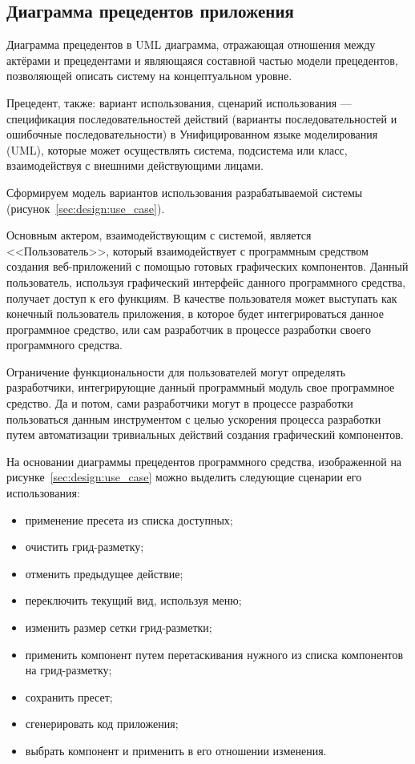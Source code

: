 \subsection{Диаграмма прецедентов приложения}
\label{sec:design:algorithm}

Диаграмма прецедентов в UML диаграмма, отражающая отношения между актёрами и прецедентами и являющаяся составной частью модели прецедентов, позволяющей описать систему на концептуальном уровне.

Прецедент, также: вариант использования, сценарий использования — спецификация последовательностей действий (варианты последовательностей и ошибочные последовательности) в Унифицированном языке моделирования (UML), которые может осуществлять система, подсистема или класс, взаимодействуя с внешними действующими лицами.

Сформируем модель вариантов использования разрабатываемой системы (рисунок~\ref{sec:design:use_case}).

Основным актером, взаимодействующим с системой, является <<Пользователь>>, который взаимодействует с программным средством создания веб-приложений с помощью 
готовых графических компонентов. Данный пользователь, используя графический интерфейс данного программного средства, получает доступ к его функциям. В качестве пользователя может выступать как конечный пользователь приложения, в которое будет интегрироваться данное программное средство, или сам разработчик в процессе разработки своего программного средства.

Ограничение функциональности для пользователей могут определять разработчики, интегрирующие данный программный модуль свое программное средство. Да и потом, сами разработчики могут в процессе разработки пользоваться данным инструментом с целью ускорения процесса разработки путем автоматизации тривиальных действий создания графический компонентов.\pagebreak

На основании диаграммы прецедентов программного средства, изображенной на рисунке~\ref{sec:design:use_case} можно выделить следующие сценарии его использования:
\begin{itemize}
    \item применение пресета из списка доступных;
    \item очистить грид-разметку;
    \item отменить предыдущее действие;
    \item переключить текущий вид, используя меню;
    \item изменить размер сетки грид-разметки;
    \item применить компонент путем перетаскивания нужного из списка компонентов на грид-разметку;
    \item сохранить пресет;
    \item сгенерировать код приложения;
    \item выбрать компонент и применить в его отношении изменения.
\end{itemize}

